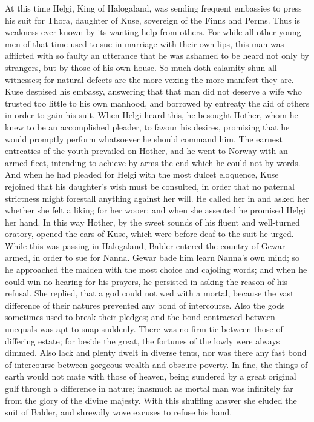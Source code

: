 \documentclass[10pt,a4paper]{report}
\begin{document}
At this time Helgi, King of Halogaland, was sending frequent embassies to press his suit for Thora, daughter of Kuse, sovereign of the Finns and Perms. Thus is weakness ever known by its wanting help from others. For while all other young men of that time used to sue in marriage with their own lips, this man was afflicted with so faulty an utterance that he was ashamed to be heard not only by strangers, but by those of his own house. So much doth calamity shun all witnesses; for natural defects are the more vexing the more manifest they are. Kuse despised his embassy, answering that that man did not deserve a wife who trusted too little to his own manhood, and borrowed by entreaty the aid of others in order to gain his suit. When Helgi heard this, he besought Hother, whom he knew to be an accomplished pleader, to favour his desires, promising that he would promptly perform whatsoever he should command him. The earnest entreaties of the youth prevailed on Hother, and he went to Norway with an armed fleet, intending to achieve by arms the end which he could not by words. And when he had pleaded for Helgi with the most dulcet eloquence, Kuse rejoined that his daughter's wish must be consulted, in order that no paternal strictness might forestall anything against her will. He called her in and asked her whether she felt a liking for her wooer; and when she assented he promised Helgi her hand. In this way Hother, by the sweet sounds of his fluent and well-turned oratory, opened the ears of Kuse, which were before deaf to the suit he urged.\\

While this was passing in Halogaland, Balder entered the country of Gewar armed, in order to sue for Nanna. Gewar bade him learn Nanna's own mind; so he approached the maiden with the most choice and cajoling words; and when he could win no hearing for his prayers, he persisted in asking the reason of his refusal. She replied, that a god could not wed with a mortal, because the vast difference of their natures prevented any bond of intercourse. Also the gods sometimes used to break their pledges; and the bond contracted between unequals was apt to snap suddenly. There was no firm tie between those of differing estate; for beside the great, the fortunes of the lowly were always dimmed. Also lack and plenty dwelt in diverse tents, nor was there any fast bond of intercourse between gorgeous wealth and obscure poverty. In fine, the things of earth would not mate with those of heaven, being sundered by a great original gulf through a difference in nature; inasmuch as mortal man was infinitely far from the glory of the divine majesty. With this shuffling answer she eluded the suit of Balder, and shrewdly wove excuses to refuse his hand.\\
\end{document}
